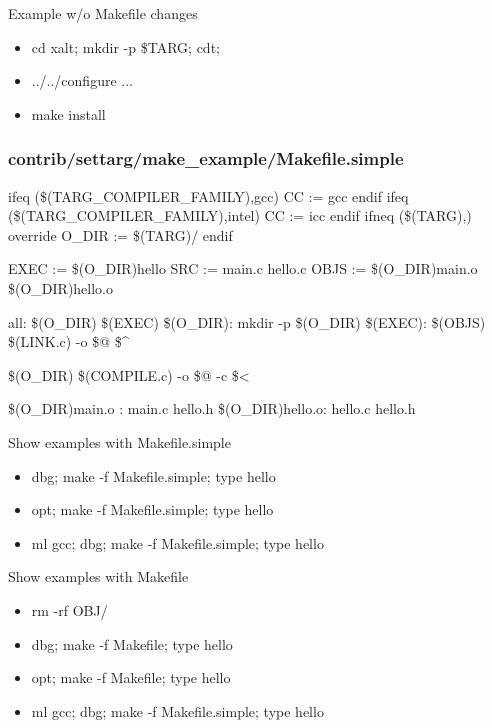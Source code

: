 \documentclass{beamer}
\begin{document}
\begin{frame}{Example w/o Makefile changes}
  \begin{itemize}
    \item cd xalt; mkdir -p \$TARG; cdt; 
    \item ../../configure ...
    \item make install
  \end{itemize}
\end{frame}

\begin{frame}[fragile]
  \frametitle{contrib/settarg/make\_example/Makefile.simple}
    {\tiny
\begin{semiverbatim}
ifeq (\$(TARG\_COMPILER\_FAMILY),gcc)
   CC := gcc
endif
ifeq (\$(TARG\_COMPILER\_FAMILY),intel)
   CC := icc
endif
ifneq (\$(TARG),)
  override O\_DIR := \$(TARG)/
endif

EXEC := \$(O\_DIR)hello
SRC  := main.c hello.c
OBJS := \$(O\_DIR)main.o \$(O\_DIR)hello.o

all: \$(O\_DIR) \$(EXEC)
\$(O\_DIR):
        mkdir -p \$(O\_DIR)
\$(EXEC): \$(OBJS)
        \$(LINK.c) -o \$@ \$^

\$(O\_DIR)%
        \$(COMPILE.c) -o \$@ -c \$<

\$(O\_DIR)main.o : main.c hello.h
\$(O\_DIR)hello.o: hello.c hello.h
\end{semiverbatim}
    }
\end{frame}

\begin{frame}{Show examples with Makefile.simple }
  \begin{itemize}
    \item dbg; make -f Makefile.simple; type hello
    \item opt; make -f Makefile.simple; type hello
    \item ml gcc; dbg; make -f Makefile.simple; type hello
  \end{itemize}
\end{frame}

\begin{frame}{Show examples with Makefile }
  \begin{itemize}
    \item rm -rf OBJ/
    \item dbg; make -f Makefile; type hello
    \item opt; make -f Makefile; type hello
    \item ml gcc; dbg; make -f Makefile.simple; type hello
  \end{itemize}
\end{frame}
\end{document}
